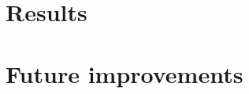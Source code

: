 \documentclass[12pt,a4paper]{scrartcl}
\begin{document}
\section{Results}

\section{Future improvements}





\nocite{*}
\end{document}
